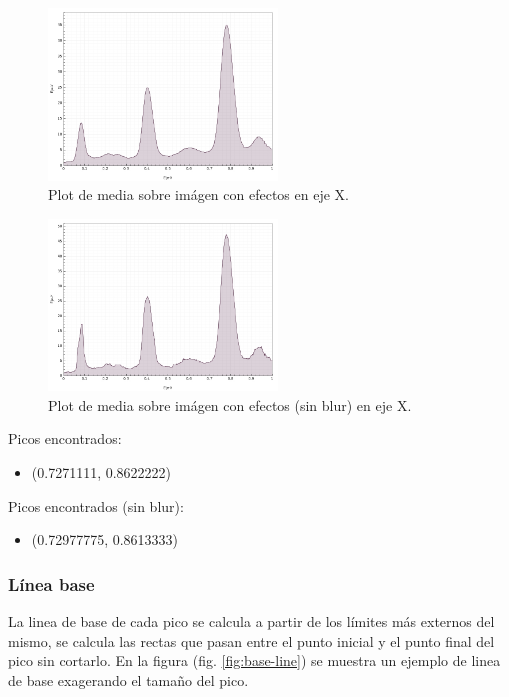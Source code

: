 \begin{figure}[H]
	\vspace{-0.2cm}
	\centering
	\includegraphics[width=230px]{imagenes-jtlc/experimento/search-peaks/6/plot-x}
	\centering
	\caption{Plot de media sobre im\'agen con efectos en eje X.}
	\label{fig:sp-6-plot-x-no-blur--repetido}
	\vspace{-0.15cm}
\end{figure}
\begin{figure}[H]
	\vspace{-0.2cm}
	\centering
	\includegraphics[width=230px]{imagenes-jtlc/experimento/search-peaks/6/plot-x-no-blur}
	\centering
	\caption{Plot de media sobre im\'agen con efectos (sin blur) en eje X.}
	\label{fig:sp-6-plot-x-no-blur}
	\vspace{-0.15cm}
\end{figure}

Picos encontrados:
\begin{itemize}
	\addtolength{\itemindent}{1cm}
	\item (0.7271111, 0.8622222)
\end{itemize}

Picos encontrados (sin blur):
\begin{itemize}
	\addtolength{\itemindent}{1cm}
	\item (0.72977775, 0.8613333)
\end{itemize}

\subsubsection{L\'inea base}
La linea de base de cada pico se calcula a partir de los l\'imites m\'as externos del mismo, se calcula las rectas que pasan entre el punto inicial y el punto final del pico sin cortarlo. En la figura (fig. \ref{fig:base-line}) se muestra un ejemplo de linea de base exagerando el tama\~no del pico.

